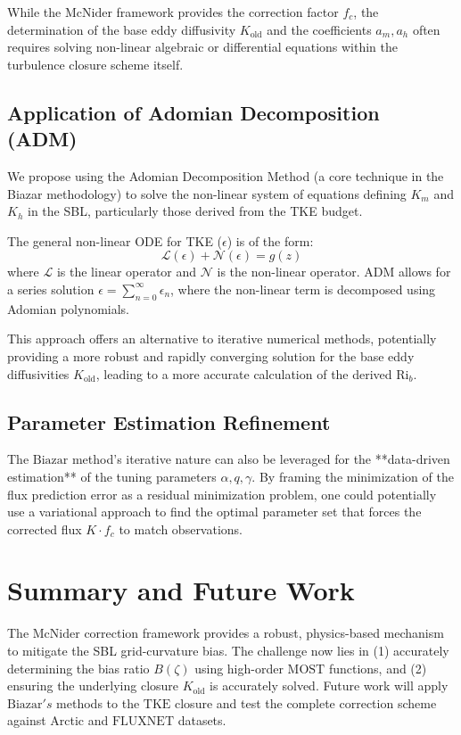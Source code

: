 \documentclass[12pt, a4paper]{article}
\begin{document}
While the $\text{McNider}$ framework provides the correction factor $f_c$, the determination of the base eddy diffusivity $K_{\text{old}}$ and the coefficients $a_m, a_h$ often requires solving non-linear algebraic or differential equations within the turbulence closure scheme itself.

\subsection{Application of Adomian Decomposition (ADM)}
We propose using the Adomian Decomposition Method (a core technique in the Biazar methodology) to solve the non-linear system of equations defining $K_m$ and $K_h$ in the SBL, particularly those derived from the TKE budget.

The general non-linear ODE for TKE ($\epsilon$) is of the form:
$$ \mathcal{L}(\epsilon) + \mathcal{N}(\epsilon) = g(z) $$
where $\mathcal{L}$ is the linear operator and $\mathcal{N}$ is the non-linear operator. $\text{ADM}$ allows for a series solution $\epsilon = \sum_{n=0}^\infty \epsilon_n$, where the non-linear term is decomposed using Adomian polynomials.

This approach offers an alternative to iterative numerical methods, potentially providing a more robust and rapidly converging solution for the base eddy diffusivities $K_{\text{old}}$, leading to a more accurate calculation of the derived $\text{Ri}_b$.

\subsection{Parameter Estimation Refinement}
The $\text{Biazar}$ method's iterative nature can also be leveraged for the **data-driven estimation** of the tuning parameters $\alpha, q, \gamma$. By framing the minimization of the flux prediction error as a residual minimization problem, one could potentially use a variational approach to find the optimal parameter set that forces the corrected flux $K \cdot f_c$ to match observations.

\section{Summary and Future Work}

The $\text{McNider}$ correction framework provides a robust, physics-based mechanism to mitigate the SBL grid-curvature bias. The challenge now lies in (1) accurately determining the bias ratio $B(\zeta)$ using high-order $\text{MOST}$ functions, and (2) ensuring the underlying closure $K_{\text{old}}$ is accurately solved. Future work will apply $\text{Biazar}'s$ methods to the $\text{TKE}$ closure and test the complete correction scheme against Arctic and $\text{FLUXNET}$ datasets.



\end{document}
